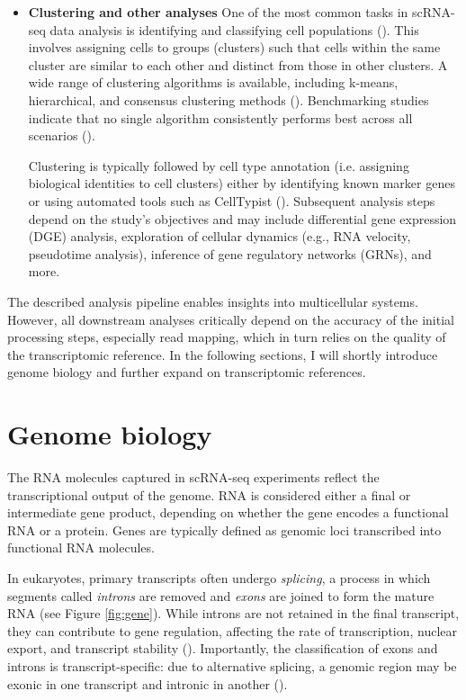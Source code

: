 \begin{itemize}
  \item \textbf{Clustering and other analyses}
One of the most common tasks in scRNA-seq data analysis is identifying and classifying cell populations (\cite{Andrews2018}).
This involves assigning cells to groups (clusters) such that cells within the same cluster are similar to each other and distinct from those in other clusters.
 A wide range of clustering algorithms is available, including k-means, hierarchical, and consensus clustering methods (\cite{Peng2020}).
 Benchmarking studies indicate that no single algorithm consistently performs best across all scenarios (\cite{Peng2020}).

Clustering is typically followed by cell type annotation (i.e. assigning biological identities to cell clusters)
either by identifying known marker genes or using automated tools such as CellTypist (\cite{Dom2022}).
Subsequent analysis steps depend on the study’s objectives and may include differential gene expression (DGE) analysis,
exploration of cellular dynamics
(e.g., RNA velocity, pseudotime analysis), inference of gene regulatory networks (GRNs), and more.
\end{itemize}

The described analysis pipeline enables insights into multicellular systems.
However, all downstream analyses critically depend on the accuracy of the initial processing steps,
especially read mapping, which in turn relies on the quality of the transcriptomic reference.
In the following sections, I will shortly introduce genome biology and further expand on transcriptomic references.

\section{Genome biology}

The RNA molecules captured in scRNA-seq experiments reflect the transcriptional output of the genome.
RNA is considered either a final or intermediate gene product,
depending on whether the gene encodes a functional RNA or a protein.
Genes are typically defined as genomic loci transcribed into functional RNA molecules.

In eukaryotes, primary transcripts often undergo \textit{splicing},
a process in which segments called \textit{introns} are removed
and \textit{exons} are joined to form the mature RNA (see Figure \ref{fig:gene}).
While introns are not retained in the final transcript, they can contribute to gene regulation,
affecting the rate of transcription, nuclear export, and transcript stability (\cite{Shaul2017}).
Importantly, the classification of exons and introns is transcript-specific:
due to alternative splicing, a genomic region may be exonic in one transcript and intronic in another (\cite{Aspden2023}).

